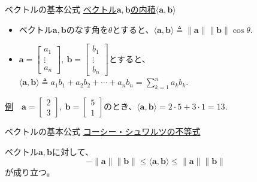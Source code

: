 \documentclass[dvipdfmx,aspectratio=169]{beamer}
\begin{document}
	\begin{frame}{ベクトルの基本公式}
		\underline{ベクトル$ \boldsymbol{a}, \boldsymbol{b} $の内積$ \langle\boldsymbol{a}, \boldsymbol{b} \rangle $}
		
		\begin{itemize}
			\item
				ベクトル$ \boldsymbol{a}, \boldsymbol{b} $のなす角を$ \theta $とすると、$ \langle\boldsymbol{a}, \boldsymbol{b} \rangle \triangleq \|\boldsymbol{a}\| \|\boldsymbol{b}\| \cos\theta. $
			\item
				$ \boldsymbol{a} = \begin{bmatrix}
					a_1\\
					\vdots\\
					a_n
				\end{bmatrix},\ \boldsymbol{b} = \begin{bmatrix}
					b_1\\
					\vdots\\
					b_n
				\end{bmatrix} $とすると、$ \langle\boldsymbol{a}, \boldsymbol{b} \rangle \triangleq a_1b_1 + a_2b_2 + \cdots + a_nb_n = \displaystyle\sum_{k=1}^n a_kb_k.$
		\end{itemize}
		
		\underline{例}　$ \boldsymbol{a} = \begin{bmatrix}
			2\\
			3
		\end{bmatrix},\ \boldsymbol{b}= \begin{bmatrix}
			5\\
			1
		\end{bmatrix} $のとき、$ \langle\boldsymbol{a}, \boldsymbol{b}\rangle = 2\cdot5 + 3\cdot1 = 13. $
	\end{frame}
	\begin{frame}{ベクトルの基本公式}
		\underline{コーシー・シュワルツの不等式}
		
		ベクトル$ \boldsymbol{a}, \boldsymbol{b} $に対して、
		\begin{equation*}
			-\|\boldsymbol{a}\| \|\boldsymbol{b}\| \leq \langle\boldsymbol{a}, \boldsymbol{b}\rangle \leq \|\boldsymbol{a}\| \|\boldsymbol{b}\|
		\end{equation*}
		が成り立つ。
	\end{frame}
\end{document}
